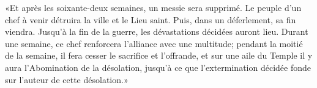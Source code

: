 «Et après les soixante-deux semaines, un messie sera supprimé.
Le peuple d’un chef à venir détruira la ville et le Lieu saint.
	Puis, dans un déferlement, sa fin viendra.
Jusqu’à la fin de la guerre, les dévastations décidées auront lieu.
Durant une semaine, ce chef renforcera l’alliance avec une multitude;
	pendant la moitié de la semaine, il fera cesser le sacrifice et l’offrande,
	et sur une aile du Temple il y aura l’Abomination de la désolation,
	jusqu’à ce que l’extermination décidée fonde sur l’auteur de cette désolation.»
